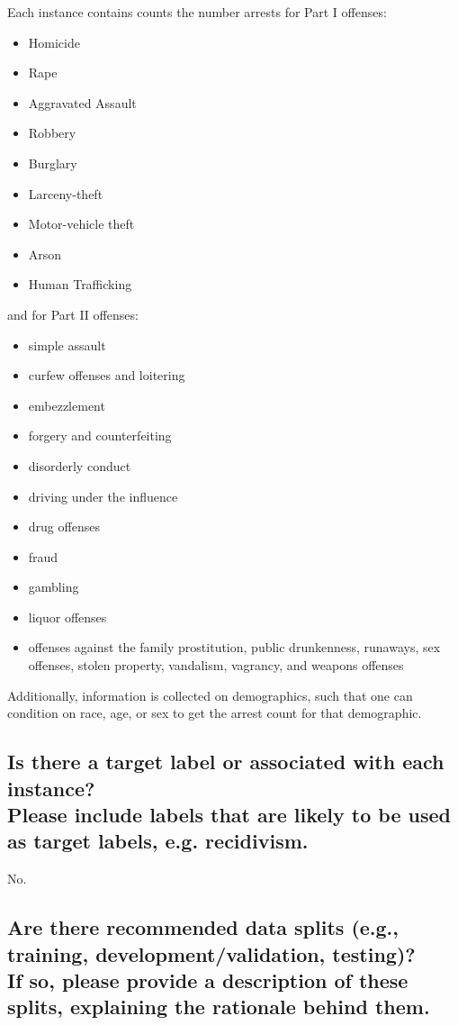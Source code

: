 \documentclass[letterpaper, 10 pt, conference]{ieeeconf}  %
\newcommand{\subtitle}[1]{{\\ \small \normalfont \color{purple} #1}}
\begin{document}
Each instance contains counts the number arrests for Part I offenses:

\begin{itemize}
    \item Homicide
    \item Rape
    \item Aggravated Assault
    \item Robbery
    \item Burglary
    \item Larceny-theft
    \item Motor-vehicle theft
    \item Arson
    \item Human Trafficking
\end{itemize}

and for Part II offenses:

\begin{itemize}
    \item simple assault
    \item curfew offenses and loitering
    \item embezzlement 
    \item forgery and counterfeiting
    \item disorderly conduct
    \item driving under the influence
    \item drug offenses
    \item fraud
    \item gambling
    \item liquor offenses
    \item offenses against the family
    prostitution, public drunkenness, runaways, sex offenses, stolen property, vandalism, vagrancy, and weapons offenses
\end{itemize}

Additionally, information is collected on demographics, such that one can condition on race, age, or sex to get the arrest count for that demographic. 

\subsection{Is there a target label or associated with each instance? \subtitle{Please include labels that are likely to be used as target labels, e.g. recidivism.}}

No.

\subsection{Are there recommended data splits (e.g., training, development/validation, testing)? \subtitle{If so, please provide a description of these splits, explaining the rationale behind them.}}
\end{document}
